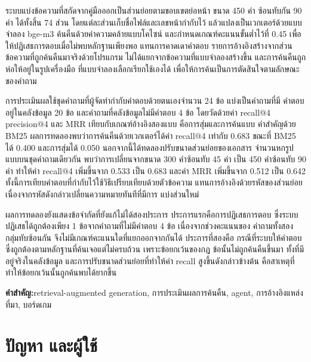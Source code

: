 \documentclass[11pt,a4paper]{article}
\begin{document}
ระบบแบ่งข้อความที่สกัดจากคู่มือออกเป็นส่วนย่อยตามขอบเขตย่อหน้า ขนาด 450 คำ
ซ้อนทับกัน 90 คำ ได้ทั้งสิ้น 74 ส่วน โดยแต่ละส่วนเก็บชื่อไฟล์และเลขหน้ากำกับไว้
แล้วแปลงเป็นเวกเตอร์ด้วยแบบจำลอง bge-m3 ค้นคืนด้วยค่าความคล้ายแบบโคไซน์
และกำหนดเกณฑ์คะแนนขั้นต่ำไว้ที่ 0.45 เพื่อให้ปฏิเสธการตอบเมื่อไม่พบหลักฐานเพียงพอ
แทนการคาดเดาคำตอบ รายการอ้างอิงสร้างจากส่วนข้อความที่ถูกค้นคืนมาจริงด้วยโปรแกรม
ไม่ได้แยกจากข้อความที่แบบจำลองสร้างขึ้น และการค้นคืนถูกห่อให้อยู่ในรูปเครื่องมือ
ที่แบบจำลองเลือกเรียกใช้เองได้ เพื่อให้การค้นเป็นการตัดสินใจตามลักษณะของคำถาม

การประเมินผลใช้ชุดคำถามที่ผู้จัดทำกำกับคำตอบด้วยตนเองจำนวน 24 ข้อ แบ่งเป็นคำถามที่มี
คำตอบอยู่ในคลังข้อมูล 20 ข้อ และคำถามที่คลังข้อมูลไม่มีคำตอบ 4 ข้อ โดยวัดด้วยค่า
recall@4 precision@4 และ MRR เทียบกับเกณฑ์อ้างอิงสองแบบ คือการสุ่มและการค้นแบบ
คำสำคัญด้วย BM25 ผลการทดลองพบว่าการค้นคืนด้วยเวกเตอร์ได้ค่า recall@4 เท่ากับ 0.683
ขณะที่ BM25 ได้ 0.400 และการสุ่มได้ 0.050 นอกจากนี้ได้ทดลองปรับขนาดส่วนย่อยของเอกสาร
จำนวนหกรูปแบบบนชุดคำถามเดียวกัน พบว่าการเปลี่ยนจากขนาด 300 คำซ้อนทับ 45 คำ
เป็น 450 คำซ้อนทับ 90 คำ ทำให้ค่า recall@4 เพิ่มขึ้นจาก 0.533 เป็น 0.683 และค่า MRR
เพิ่มขึ้นจาก 0.512 เป็น 0.642 ทั้งนี้การเทียบคำตอบที่กำกับไว้ใช้วิธีเปรียบเทียบด้วยตัวข้อความ
แทนการอ้างอิงด้วยรหัสของส่วนย่อย เนื่องจากรหัสดังกล่าวเปลี่ยนความหมายทันทีที่มีการ
แบ่งส่วนใหม่

ผลการทดลองยังแสดงข้อจำกัดที่ยังแก้ไม่ได้สองประการ ประการแรกคือการปฏิเสธการตอบ
ซึ่งระบบปฏิเสธได้ถูกต้องเพียง 1 ข้อจากคำถามที่ไม่มีคำตอบ 4 ข้อ เนื่องจากช่วงคะแนนของ
คำถามทั้งสองกลุ่มทับซ้อนกัน จึงไม่มีเกณฑ์คะแนนใดที่แยกออกจากกันได้ ประการที่สองคือ
กรณีที่ระบบให้คำตอบซึ่งถูกต้องตามหลักฐานที่ค้นเจอแต่ไม่ครบถ้วน เพราะข้อยกเว้นของกฎ
ข้อนั้นไม่ถูกค้นคืนขึ้นมา ทั้งที่มีอยู่จริงในคลังข้อมูล และการปรับขนาดส่วนย่อยที่ทำให้ค่า
recall สูงขึ้นดังกล่าวข้างต้น คือสาเหตุที่ทำให้ข้อยกเว้นนั้นถูกค้นพบได้ยากขึ้น

\vspace{1em}
\noindent\textbf{คำสำคัญ:}\quad retrieval-augmented generation, การประเมินผลการค้นคืน,
agent, การอ้างอิงแหล่งที่มา, บอร์ดเกม


\section{ปัญหา และผู้ใช้}
\end{document}
